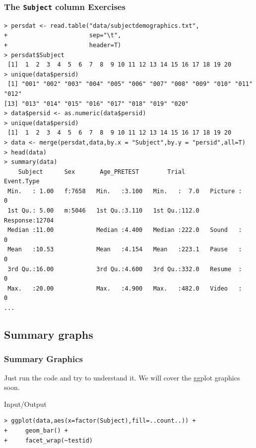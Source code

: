 \documentclass[xcolor={table},c]{beamer}
\begin{document}
\begin{frame}[fragile]\frametitle{The \texttt{Subject} column Exercises}
\begin{verbatim}
> persdat <- read.table("data/subjectdemographics.txt",
+                       sep="\t",
+                       header=T)
> persdat$Subject
 [1]  1  2  3  4  5  6  7  8  9 10 11 12 13 14 15 16 17 18 19 20
> unique(data$persid)
 [1] "001" "002" "003" "004" "005" "006" "007" "008" "009" "010" "011" "012"
[13] "013" "014" "015" "016" "017" "018" "019" "020"
> data$persid <- as.numeric(data$persid)
> unique(data$persid)
 [1]  1  2  3  4  5  6  7  8  9 10 11 12 13 14 15 16 17 18 19 20
> data <- merge(persdat,data,by.x = "Subject",by.y = "persid",all=T)
> head(data)
> summary(data)
    Subject      Sex       Age_PRETEST        Trial          Event.Type   
 Min.   : 1.00   f:7658   Min.   :3.100   Min.   :  7.0   Picture :    0  
 1st Qu.: 5.00   m:5046   1st Qu.:3.110   1st Qu.:112.0   Response:12704  
 Median :11.00            Median :4.400   Median :222.0   Sound   :    0  
 Mean   :10.53            Mean   :4.154   Mean   :223.1   Pause   :    0  
 3rd Qu.:16.00            3rd Qu.:4.600   3rd Qu.:332.0   Resume  :    0  
 Max.   :20.00            Max.   :4.900   Max.   :482.0   Video   :    0  
...
\end{verbatim}
\end{frame}


\subsection{Summary graphs}
\begin{frame}[fragile]\frametitle{Summary Graphics}
Just run the code and try to understand it. We will cover the ggplot graphics soon.
\begin{exampleblock}{Input/Output}\tiny
\begin{verbatim}
> ggplot(data,aes(x=factor(Subject),fill=..count..)) +
+     geom_bar() +
+     facet_wrap(~testid)
\end{verbatim}
    \end{exampleblock}
\begin{center}
\end{center}
\end{frame}
\end{document}
